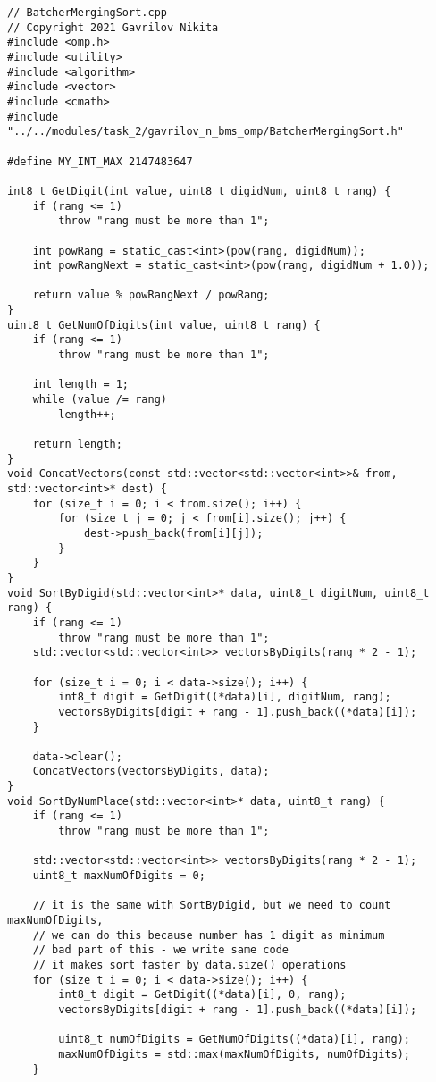 \documentclass{report}
\begin{document}
\begin{lstlisting}
// BatcherMergingSort.cpp
// Copyright 2021 Gavrilov Nikita
#include <omp.h>
#include <utility>
#include <algorithm>
#include <vector>
#include <cmath>
#include "../../modules/task_2/gavrilov_n_bms_omp/BatcherMergingSort.h"

#define MY_INT_MAX 2147483647

int8_t GetDigit(int value, uint8_t digidNum, uint8_t rang) {
    if (rang <= 1)
        throw "rang must be more than 1";

    int powRang = static_cast<int>(pow(rang, digidNum));
    int powRangNext = static_cast<int>(pow(rang, digidNum + 1.0));

    return value % powRangNext / powRang;
}
uint8_t GetNumOfDigits(int value, uint8_t rang) {
    if (rang <= 1)
        throw "rang must be more than 1";

    int length = 1;
    while (value /= rang)
        length++;

    return length;
}
void ConcatVectors(const std::vector<std::vector<int>>& from, std::vector<int>* dest) {
    for (size_t i = 0; i < from.size(); i++) {
        for (size_t j = 0; j < from[i].size(); j++) {
            dest->push_back(from[i][j]);
        }
    }
}
void SortByDigid(std::vector<int>* data, uint8_t digitNum, uint8_t rang) {
    if (rang <= 1)
        throw "rang must be more than 1";
    std::vector<std::vector<int>> vectorsByDigits(rang * 2 - 1);

    for (size_t i = 0; i < data->size(); i++) {
        int8_t digit = GetDigit((*data)[i], digitNum, rang);
        vectorsByDigits[digit + rang - 1].push_back((*data)[i]);
    }

    data->clear();
    ConcatVectors(vectorsByDigits, data);
}
void SortByNumPlace(std::vector<int>* data, uint8_t rang) {
    if (rang <= 1)
        throw "rang must be more than 1";

    std::vector<std::vector<int>> vectorsByDigits(rang * 2 - 1);
    uint8_t maxNumOfDigits = 0;

    // it is the same with SortByDigid, but we need to count maxNumOfDigits,
    // we can do this because number has 1 digit as minimum
    // bad part of this - we write same code
    // it makes sort faster by data.size() operations
    for (size_t i = 0; i < data->size(); i++) {
        int8_t digit = GetDigit((*data)[i], 0, rang);
        vectorsByDigits[digit + rang - 1].push_back((*data)[i]);

        uint8_t numOfDigits = GetNumOfDigits((*data)[i], rang);
        maxNumOfDigits = std::max(maxNumOfDigits, numOfDigits);
    }


\end{lstlisting}
\end{document}
